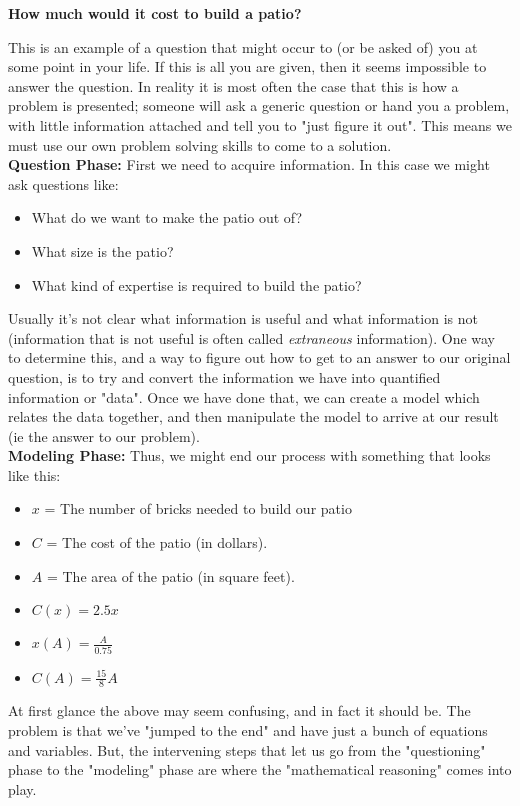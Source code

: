 \documentclass{ximeraXloud}
\begin{document}
    \begin{exploration}
        {\large \bfseries How much would it cost to build a patio?}
        
        This is an example of a question that might occur to (or be asked of) you at some point in your life. If this is all you are given, then it seems impossible to answer the question. In reality it is most often the case that this is how a problem is presented; someone will ask a generic question or hand you a problem, with little information attached and tell you to "just figure it out". This means we must use our own problem solving skills to come to a solution.\\
        
        {\bfseries Question Phase:} First we need to acquire information. In this case we might ask questions like:
        \begin{itemize}
            \item What do we want to make the patio out of?
            \item What size is the patio?
            \item What kind of expertise is required to build the patio?
        \end{itemize}
        Usually it's not clear what information is useful and what information is not (information that is not useful is often called \textit{extraneous} information). One way to determine this, and a way to figure out how to get to an answer to our original question, is to try and convert the information we have into quantified information or "data". Once we have done that, we can create a model which relates the data together, and then manipulate the model to arrive at our result (ie the answer to our problem).\\
        
        {\bfseries Modeling Phase:}
        Thus, we might end our process with something that looks like this:
        \begin{itemize}
            \item $x$ = The number of bricks needed to build our patio
            \item $C$ = The cost of the patio (in dollars).
            \item $A$ = The area of the patio (in square feet).
            \item $C(x) = 2.5x$
            \item $x(A) = \frac{A}{0.75}$
            \item $C(A) = \frac{15}{8}A$
        \end{itemize}
        At first glance the above may seem confusing, and in fact it should be. The problem is that we've "jumped to the end" and have just a bunch of equations and variables. But, the intervening steps that let us go from the "questioning" phase to the "modeling" phase are where the "mathematical reasoning" comes into play.\\
        

\end{exploration}
\end{document}
